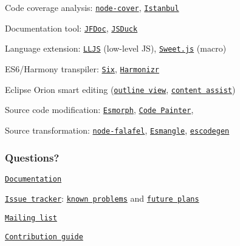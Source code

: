 \begin{DoxyItemize}
\item Code coverage analysis\+: \href{https://github.com/itay/node-cover}{\tt node-\/cover}, \href{https://github.com/yahoo/Istanbul}{\tt Istanbul}
\item Documentation tool\+: \href{https://github.com/thejohnfreeman/jfdoc}{\tt J\+F\+Doc}, \href{https://github.com/senchalabs/jsduck}{\tt J\+S\+Duck}
\item Language extension\+: \href{http://mbebenita.github.com/LLJS/}{\tt L\+L\+JS} (low-\/level JS), \href{http://sweetjs.org/}{\tt Sweet.\+js} (macro)
\item E\+S6/\+Harmony transpiler\+: \href{https://github.com/matthewrobb/six}{\tt Six}, \href{https://github.com/jdiamond/harmonizr}{\tt Harmonizr}
\item Eclipse Orion smart editing (\href{https://github.com/aclement/esprima-outline}{\tt outline view}, \href{http://contraptionsforprogramming.blogspot.com/2012/02/better-javascript-content-assist-in.html}{\tt content assist})
\item Source code modification\+: \href{https://github.com/ariya/esmorph}{\tt Esmorph}, \href{https://github.com/fawek/codepainter}{\tt Code Painter},
\item Source transformation\+: \href{https://github.com/substack/node-falafel}{\tt node-\/falafel}, \href{https://github.com/Constellation/esmangle}{\tt Esmangle}, \href{https://github.com/Constellation/escodegen}{\tt escodegen}
\end{DoxyItemize}

\subsubsection*{Questions?}


\begin{DoxyItemize}
\item \href{http://esprima.org/doc}{\tt Documentation}
\item \href{http://issues.esprima.org}{\tt Issue tracker}\+: \href{http://code.google.com/p/esprima/issues/list?q=Defect}{\tt known problems} and \href{http://code.google.com/p/esprima/issues/list?q=Enhancement}{\tt future plans}
\item \href{http://groups.google.com/group/esprima}{\tt Mailing list}
\item \href{http://esprima.org/doc/index.html#contribution}{\tt Contribution guide}
\end{DoxyItemize}

